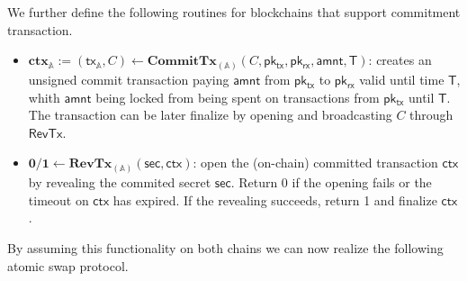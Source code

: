 \documentclass{article}      	%
\begin{document}
We further define the following routines for blockchains that support commitment transaction.
\begin{itemize}[topsep=0pt, itemsep=0pt, leftmargin=2em]
	\item $\mathbf{ctx}_{\mathbb{A}} := (\mathsf{tx_{\mathbb{A}}}, C) \gets \mathbf{CommitTx}_{(\mathbb{A})}(C, \mathsf{pk_{tx}}, \mathsf{pk_{rx}}, \mathsf{amnt}, \mathsf{T})$: creates an unsigned commit transaction paying $\mathsf{amnt}$ from $\mathsf{pk_{tx}}$ to $\mathsf{pk_{rx}}$ valid until time $\mathsf{T}$, whith  $\mathsf{amnt}$ being locked from being spent on transactions from $\mathsf{pk_{tx}}$ until $\mathsf{T}$. The transaction can be later finalize by opening and broadcasting $C$ through $\mathsf{RevTx}$.
\item $ \mathbf{0/1} \gets \mathbf{RevTx}_{(\mathbb{A})}(\mathsf{sec}, \mathsf{ctx})$: open the (on-chain) committed transaction $\mathsf{ctx}$ by revealing the commited secret $\mathsf{sec}$. Return 0 if the opening fails or the timeout on $\mathsf{ctx}$ has expired. If the revealing succeeds, return 1 and finalize $\mathsf{ctx}$.
\end{itemize}

By assuming this functionality on both chains we can now realize the following atomic swap protocol.
\end{document}
